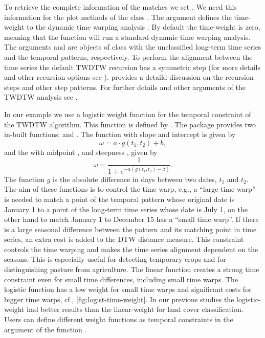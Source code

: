 \documentclass[article,shortnames]{jss}
\begin{document}
To retrieve the complete information of the matches we set
. We need this information for the plot methods of the
class . The argument  defines the
time-weight to the dynamic time warping analysis \citep{Maus:2016}. By
default the time-weight is zero, meaning that the function will run a
standard dynamic time warping analysis. The arguments  and
 are objects of class  with the
unclassified long-term time series and the temporal patterns,
respectively. To perform the alignment between the time series the
default TWDTW recursion has a symmetric step (for more details and other
recursion options see ). \citet{Giorgino:2009}
provides a detaild discussion on the recursion steps and other step
patterns. For further details and other arguments of the TWDTW analysis
see .

In our example we use a logistic weight function for the temporal
constraint of the TWDTW algorithm. This function is defined by
. The  package provides two in-built
functions:  and . The
 function with slope  and intercept 
is given by \[
    \omega = a \cdot g(t_1,t_2) + b,
    \label{eq:lineartw}
\] and the  with midpoint , and
steepness , given by \[
    \omega = \frac{1}{1 + e^{-\alpha(g(t_1,t_2)-\beta)} }.
    \label{eq:nonlineartw}
\] The function \(g\) is the absolute difference in days between two
dates, \(t_1\) and \(t_2\). The aim of these functions is to control the
time warp, e.g., a ``large time warp'' is needed to match a point of the
temporal pattern whose original date is January 1 to a point of the
long-term time series whose date is July 1, on the other hand to match
January 1 to December 15 has a ``small time warp''. If there is a large
seasonal difference between the pattern and its matching point in time
series, an extra cost is added to the DTW distance measure. This
constraint controls the time warping and makes the time series alignment
dependent on the seasons. This is especially useful for detecting
temporary crops and for distinguishing pasture from agriculture. The
linear function creates a strong time constraint even for small time
differences, including small time warps. The logistic function has a low
weight for small time warps and significant costs for bigger time warps,
cf., \autoref{fig:logist-time-weight}. In our previous studies
\citep{Maus:2016} the logistic-weight had better results than the
linear-weight for land cover classification. Users can define different
weight functions as temporal constraints in the argument
 of the function .
\end{document}
